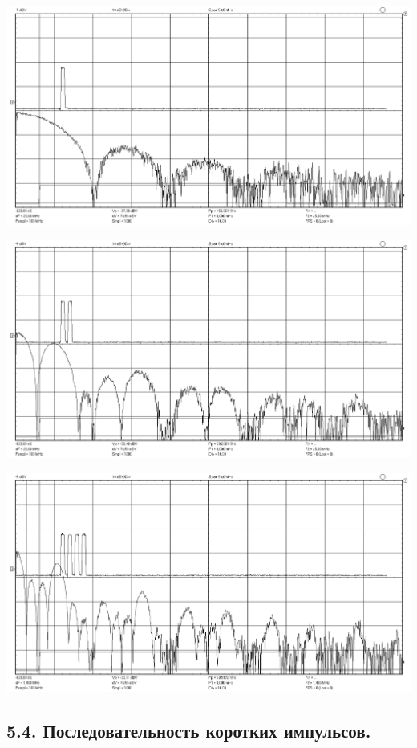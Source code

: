 \documentclass[12pt,a4paper]{article}
\begin{document}
\begin{center}
	\includegraphics[width=.8\linewidth]{data/53_n1}\hfill
\end{center}	
\begin{center}
	\includegraphics[width=.8\linewidth]{data/53_n2}\hfill
\end{center}	
\begin{center}
	\includegraphics[width=.8\linewidth]{data/53_n4}\hfill
\end{center}	

\newpage

\subsection*{5.4. Последовательность коротких импульсов.}
\vspace*{20pt}
\end{document}
